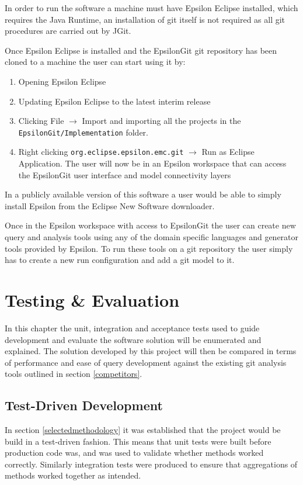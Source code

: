 \documentclass[11pt]{book}
\newcommand{\code}[1]{\texttt{#1}}
\begin{document}
In order to run the software a machine must have Epsilon Eclipse \cite{epsilonhomepage} installed, which requires the Java Runtime, an installation of git itself is not required as all git procedures are carried out by JGit.

Once Epsilon Eclipse is installed and the EpsilonGit git repository has been cloned to a machine the user can start using it by:

\begin{enumerate}
	\item Opening Epsilon Eclipse
	\item Updating Epsilon Eclipse to the latest interim release
	\item Clicking File $\rightarrow
$ Import and importing all the projects in the \code{EpsilonGit/Implementation} folder.
	\item Right clicking \code{org.eclipse.epsilon.emc.git} $\rightarrow
$ Run as Eclipse Application. The user will now be in an Epsilon workspace that can access the EpsilonGit user interface and model connectivity layers
\end{enumerate}

In a publicly available version of this software a user would be able to simply install Epsilon from the Eclipse New Software downloader.

Once in the Epsilon workspace with access to EpsilonGit the user can create new query and analysis tools using any of the domain specific languages and generator tools provided by Epsilon. To run these tools on a git repository the user simply has to create a new run configuration and add a git model to it.


\chapter{Testing \& Evaluation}
\label{testeval}
In this chapter the unit, integration and acceptance tests used to guide development and evaluate the software solution will be enumerated and explained. The solution developed by this project will then be compared in terms of performance and ease of query development against the existing git analysis tools outlined in section \ref{competitors}.

\section{Test-Driven Development}
In section \ref{selectedmethodology} it was established that the project would be build in a test-driven fashion. This means that unit tests were built before production code was, and was used to validate whether methods worked correctly. Similarly integration tests were produced to ensure that aggregations of methods worked together as intended.
\end{document}
